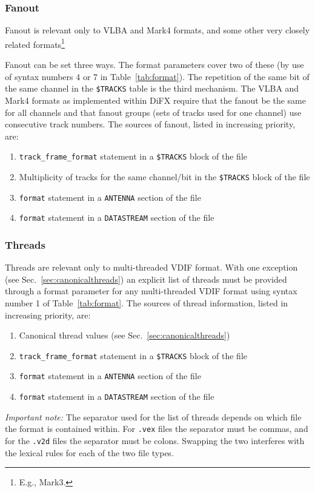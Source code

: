 \documentclass[12pt]{article}
\begin{document}
\subsubsection{Fanout}

Fanout is relevant only to VLBA and Mark4 formats, and some other very closely related formats\footnote{E.g., Mark3.}

Fanout can be set three ways.
The format parameters cover two of these (by use of syntax numbers 4 or 7 in Table~\ref{tab:format}).
The repetition of the same bit of the same channel in the {\tt \$TRACKS} table is the third mechanism.
The VLBA and Mark4 formats as implemented within DiFX require that the fanout be the same for all channels and that fanout groups (sets of tracks used for one channel) use consecutive track numbers.
The sources of fanout, listed in increasing priority, are:
\begin{enumerate}
\item {\tt track\_frame\_format} statement in a {\tt \$TRACKS} block of the \vx file
\item Multiplicity of tracks for the same channel/bit in the {\tt \$TRACKS} block of the \vx file
\item {\tt format} statement in a {\tt ANTENNA} section of the \vd file
\item {\tt format} statement in a {\tt DATASTREAM} section of the \vd file
\end{enumerate}

\subsubsection{Threads}

Threads are relevant only to multi-threaded VDIF format.
With one exception (see Sec.~\ref{sec:canonicalthreads}) an explicit list of threads must be provided through a format parameter for any multi-threaded VDIF format using syntax number 1 of Table~\ref{tab:format}.
The sources of thread information, listed in increasing priority, are:
\begin{enumerate}
\item Canonical thread values (see Sec.~\ref{sec:canonicalthreads})
\item {\tt track\_frame\_format} statement in a {\tt \$TRACKS} block of the \vx file
\item {\tt format} statement in a {\tt ANTENNA} section of the \vd file
\item {\tt format} statement in a {\tt DATASTREAM} section of the \vd file
\end{enumerate}
{\em Important note:} The separator used for the list of threads depends on which file the format is contained within.
For {\tt .vex} files the separator must be commas, and for the {\tt .v2d} files the separator must be colons.
Swapping the two interferes with the lexical rules for each of the two file types.
\end{document}
